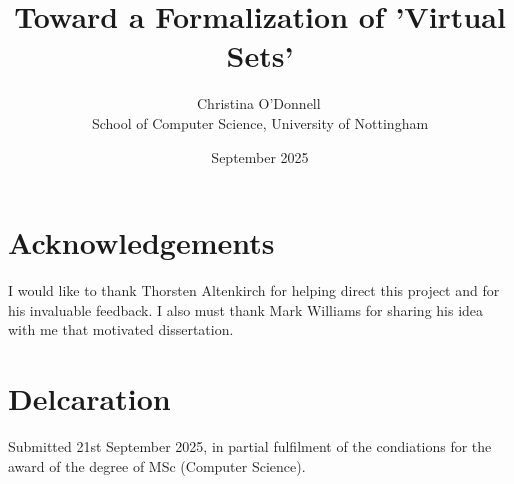 \documentclass[4pt,a4paper]{report}
\title{Toward a Formalization of 'Virtual Sets'}
\author{Christina O'Donnell\, \\
  School of Computer Science, University of Nottingham}
\date{September 2025}
\begin{document}
\maketitle

\section*{Acknowledgements}
I would like to thank Thorsten Altenkirch
for helping direct this project and for his invaluable feedback. I
also must thank Mark Williams for sharing his idea with me that
motivated dissertation.

\section*{Delcaration}
Submitted 21st September 2025, in partial fulfilment of the condiations for the award of the degree of MSc (Computer Science).
\end{document}
